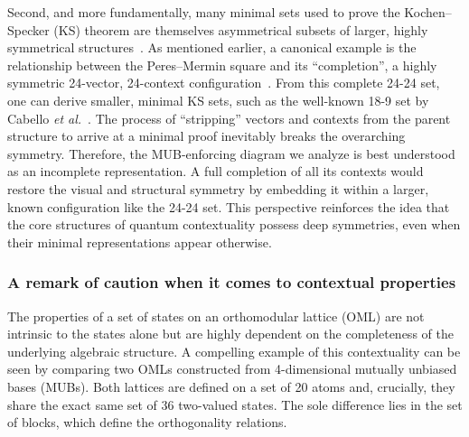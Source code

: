 \documentclass[%
  reprint,
  superscriptaddress,
  showpacs,
  showkeys,
  amsmath,amssymb,
  pra,
  longbibliography,
  floatfix,
  x11names
]{revtex4-2}
\begin{document}
Second, and more fundamentally, many minimal sets used to prove the Kochen--Specker (KS) theorem are themselves asymmetrical subsets of larger, highly symmetrical structures~\cite{peres111,mermin90b,peres-91}.
As mentioned earlier, a canonical example is the relationship between the Peres--Mermin square and its ``completion'', a highly symmetric 24-vector, 24-context configuration~\cite{Pavicic-2005,pavicic-2005csvcorri}.
From this complete 24-24 set, one can derive smaller, minimal KS sets, such as the well-known 18-9 set by Cabello \textit{et al.}~\cite{cabello-96,cabello:210401}.
The process of ``stripping'' vectors and contexts from the parent structure to arrive at a minimal proof inevitably breaks the overarching symmetry.
Therefore, the MUB-enforcing diagram we analyze is best understood as an incomplete representation.
A full completion of all its contexts would restore the visual and structural symmetry by embedding it within a larger, known configuration like the 24-24 set.
This perspective reinforces the idea that the core structures of quantum contextuality possess deep symmetries, even when their minimal representations appear otherwise.


\subsubsection{A remark of caution when it comes to contextual properties}

The properties of a set of states on an orthomodular lattice (OML) are not intrinsic to the states alone but are highly dependent on the completeness of the underlying algebraic structure. A compelling example of this contextuality can be seen by comparing two OMLs constructed from 4-dimensional mutually unbiased bases (MUBs). Both lattices are defined on a set of 20 atoms and, crucially, they share the exact same set of 36 two-valued states. The sole difference lies in the set of blocks, which define the orthogonality relations.
\end{document}
